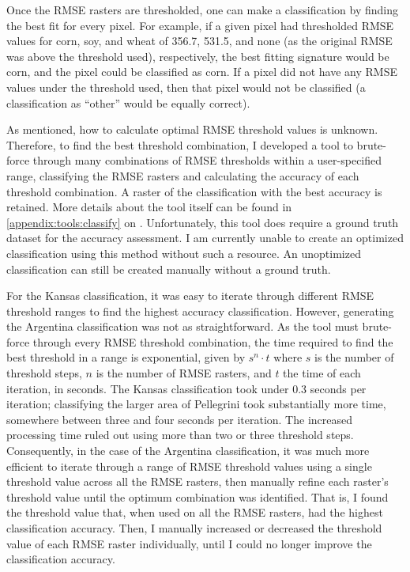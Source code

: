 Once the RMSE rasters are thresholded, one can make a classification by finding the best fit for every pixel. For example, if a given pixel had thresholded RMSE values for corn, soy, and wheat of 356.7, 531.5, and none (as the original RMSE was above the threshold used), respectively, the best fitting signature would be corn, and the pixel could be classified as corn. If a pixel did not have any RMSE values under the threshold used, then that pixel would not be classified (a classification as ``other'' would be equally correct).

As mentioned, how to calculate optimal RMSE threshold values is unknown. Therefore, to find the best threshold combination, I developed a tool to brute-force through many combinations of RMSE thresholds within a user-specified range, classifying the RMSE rasters and calculating the accuracy of each threshold combination. A raster of the classification with the best accuracy is retained. More details about the tool itself can be found in \autoref{appendix:tools:classify} on . Unfortunately, this tool does require a ground truth dataset for the accuracy assessment. I am currently unable to create an optimized classification using this method without such a resource. An unoptimized classification can still be created manually without a ground truth.

For the Kansas classification, it was easy to iterate through different RMSE threshold ranges to find the highest accuracy classification. However, generating the Argentina classification was not as straightforward. As the tool must brute-force through every RMSE threshold combination, the time required to find the best threshold in a range is exponential, given by $s^n\cdot t$ where $s$ is the number of threshold steps, $n$ is the number of RMSE rasters, and $t$ the time of each iteration, in seconds. The Kansas classification took under 0.3 seconds per iteration; classifying the larger area of Pellegrini took substantially more time, somewhere between three and four seconds per iteration. The increased processing time ruled out using more than two or three threshold steps. Consequently, in the case of the Argentina classification, it was much more efficient to iterate through a range of RMSE threshold values using a single threshold value across all the RMSE rasters, then manually refine each raster's threshold value until the optimum combination was identified. That is, I found the threshold value that, when used on all the RMSE rasters, had the highest classification accuracy. Then, I manually increased or decreased the threshold value of each RMSE raster individually, until I could no longer improve the classification accuracy.